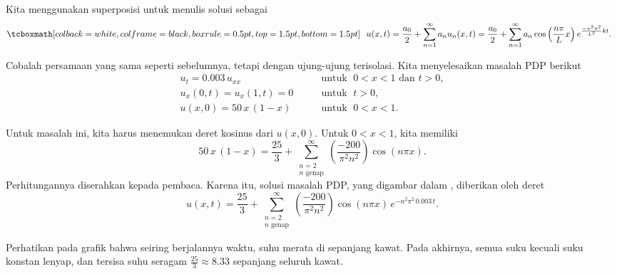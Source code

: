 Kita menggunakan superposisi untuk menulis solusi sebagai
\begin{equation*}
\mybxbg{~~
u(x,t) = 
\frac{a_0}{2} + 
\sum_{n=1}^\infty
a_n
u_n(x,t)
=
\frac{a_0}{2} + 
\sum_{n=1}^\infty
a_n
\cos \left( \frac{n \pi}{L} x \right)
e^{\frac{-n^2 \pi^2}{L^2} k t} .
~~}
\end{equation*}

\begin{example}
Cobalah persamaan yang sama seperti sebelumnya, tetapi dengan ujung-ujung terisolasi.
Kita menyelesaikan masalah PDP berikut
\begin{equation*}
\begin{array}{ll}
u_t = 0.003 \, u_{xx} & \qquad \text{untuk } \; 0 < x < 1 \text{ dan } t > 0, \\
u_x(0,t) = u_x(1,t) = 0  & \qquad  \text{untuk } \; t > 0, \\
u(x,0) = 50\,x\,(1-x) & \qquad \text{untuk } \; 0 < x < 1 .
\end{array}
\end{equation*}


Untuk masalah ini, kita harus menemukan deret kosinus dari $u(x,0)$.
Untuk $0 < x < 1$, kita memiliki
\begin{equation*}
50\, x\,(1-x)
=
\frac{25}{3} +
\sum_{\substack{n=2 \\ n \text{ genap}}}^\infty
\left( \frac{-200}{\pi^2 n^2} \right)
\cos (n \pi x) .
\end{equation*}
Perhitungannya diserahkan kepada pembaca.
Karena itu, solusi masalah PDP, yang digambar dalam
, diberikan oleh deret
\begin{equation*}
u(x,t)
=
\frac{25}{3} +
\sum_{\substack{n=2 \\ n \text{ genap}}}^\infty
\left( \frac{-200}{\pi^2 n^2} \right)
\cos ( n \pi x)
\, e^{-n^2 \pi^2 \, 0.003 \, t} .
\end{equation*}

\begin{myfig}
\capstart
{}
\caption{Grafik suhu kawat terisolasi pada posisi $x$
pada waktu $t$.\label{heat:wireisolexfig}}
\end{myfig}

Perhatikan pada grafik
bahwa seiring berjalannya waktu, suhu merata di sepanjang kawat.  Pada akhirnya, semua
suku kecuali suku konstan
lenyap, dan tersisa suhu seragam
$\frac{25}{3} \approx 8.33$ sepanjang seluruh kawat.
\end{example}

